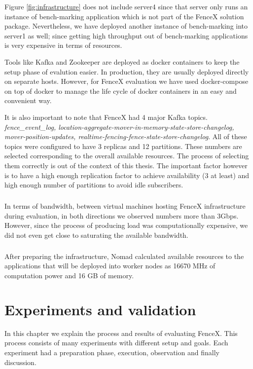 \documentclass[a4]{report}
\begin{document}
    Figure \ref{fig:infrastructure} does not include server4 since that server only runs an instance of bench-marking
    application which is not part of the FenceX solution package.
    Nevertheless, we have deployed another instance of bench-marking into server1 as well;
    since getting high throughput out of bench-marking applications is very expensive in terms of resources.

    Tools like Kafka and Zookeeper are deployed as docker containers to keep the setup phase of evalution easier.
    In production, they are usually deployed directly on separate hosts.
    However, for FenceX evaluation we have used docker-compose on top of docker to manage the life cycle of docker
    containers in an easy and convenient way.

    It is also important to note that FenceX had 4 major Kafka topics.
    \textit{fence\_event\_log, location-aggregate-mover-in-memory-state-store-changelog, mover-position-updates,
        realtime-fencing-fence-state-store-changelog}.
    All of these topics were configured to have 3 replicas and 12 partitions.
    These numbers are selected corresponding to the overall available resources.
    The process of selecting them correctly is out of the context of this thesis.
    The important factor however is to have a high enough replication factor to achieve availability (3 at least) and
    high enough number of partitions to avoid idle subscribers.

    \paragraph{}
    In terms of bandwidth, between virtual machines hosting FenceX infrastructure during evaluation, in both
    directions we observed numbers more than 3Gbps.
    However, since the process of producing load was computationally expensive, we did not even get close to saturating
    the available bandwidth.

    \paragraph{}
    After preparing the infrastructure, Nomad calculated available resources to the applications that will be
    deployed into worker nodes as 16670 MHz of computation power and 16 GB of memory.


    \chapter{Experiments and validation}
    In this chapter we explain the process and results of evaluating FenceX.
    This process consists of many experiments with different setup and goals.
    Each experiment had a preparation phase, execution, observation and finally discussion.
\end{document}
